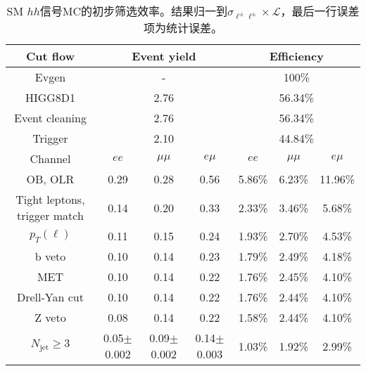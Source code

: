 \begin{table}
\centering\small
\begin{tabular}{c|ccc|ccc}
\hline
\hline
Cut flow &\multicolumn{3}{c|}{Event yield}&\multicolumn{3}{c}{Efficiency}      \\
\hline
Evgen&\multicolumn{3}{c|}{-}&\multicolumn{3}{c}{100\%}\\
HIGG8D1&\multicolumn{3}{c|}{2.76}&\multicolumn{3}{c}{56.34\%}\\
Event cleaning&\multicolumn{3}{c|}{2.76}&\multicolumn{3}{c}{56.34\%}\\
Trigger&\multicolumn{3}{c|}{2.10    }&\multicolumn{3}{c}{44.84\%}\\
Channel&$ee$&$\mu\mu$&$e\mu$&$ee$&$\mu\mu$&$e\mu$\\
\hline
OB, OLR    &0.29    &0.28    &0.56& 5.86\%    &6.23\%    &11.96\%\\
Tight leptons, trigger match    &0.14    &0.20    &0.33    &2.33\%    &3.46\%    &5.68\%\\
$p_T(\ell)$    &0.11    &0.15    &0.24    &1.93\%    &2.70\%    &4.53\%\\
b veto    &0.10    &0.14    &0.23    &1.79\%    &2.49\%    &4.18\%\\
MET    &0.10    &0.14    &0.22    &1.76\%    &2.45\%    &4.10\%\\
Drell-Yan cut    &0.10    &0.14    &0.22    &1.76\%    &2.44\%    &4.10\%\\
Z veto    &0.08    &0.14    &0.22    &1.58\%    &2.44\%    &4.10\%\\
$N_{\text{jet}}\geq3$    &0.05$\pm$0.002    &0.09$\pm$0.002    &0.14$\pm$0.003    &1.03\%    &1.92\%    &2.99\%\\
\hline
\hline
\end{tabular}
\caption{SM $hh$信号MC的初步筛选效率。结果归一到$\sigma_{\ell^{\pm}\ell^{\pm}}\times \mathcal{L}$，最后一行误差项为统计误差。}
\label{tab:presel_cutflow_smhh}
\end{table}
